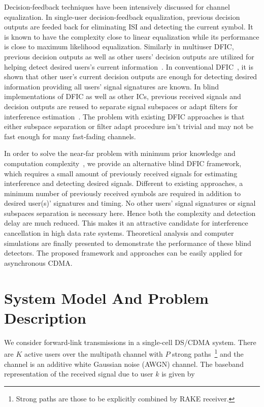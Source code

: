 \documentclass[a4paper,10pt,fleqn, twocolumn]{IEEETran}
\begin{document}
Decision-feedback techniques have been intensively discussed for
channel equalization. In single-user decision-feedback
equalization, previous decision outputs are feeded back for
eliminating ISI and detecting the current symbol. It is known to
have the complexity close to linear equalization while its
performance is close to maximum likelihood equalization. Similarly
in multiuser DFIC, previous decision outputs as well as other
users' decision outputs are utilized for helping detect desired
users's current information~\cite{Madh94,Madh98,Wang98,Verd98}. In
conventional DFIC~\cite{Verd98}, it is shown that other user's
current decision outputs are enough for detecting desired
information providing all users' signal signatures are known. In
blind implementations of DFIC as well as other ICs, previous
received signals and decision outputs are reused to separate
signal subspaces or adapt filters for interference
estimation~\cite{Madh98,Wang98}. The problem with existing DFIC
approaches is that either subspace separation or filter adapt
procedure isn't trivial and may not be fast enough for many
fast-fading channels.

In order to solve the near-far problem with minimum prior
knowledge and computation complexity~\cite{Wang03d,Wang05A}, we
provide an alternative blind DFIC framework, which requires a
small amount of previously received signals for estimating
interference and detecting desired signals. Different to existing
approaches, a minimum number of previously received symbols are
required in addition to desired user(s)' signatures and timing. No
other users' signal signatures or signal subspaces separation is
necessary here. Hence both the complexity and detection delay are
much reduced. This makes it an attractive candidate for
interference cancellation in high data rate systems. Theoretical
analysis and computer simulations are finally presented to
demonstrate the performance of these blind detectors. The proposed
framework and approaches can be easily applied for asynchronous
CDMA.
\section{System Model And Problem Description}
We consider forward-link transmissions in a single-cell DS/CDMA
system. There are $K$ active users over the multipath channel with
$P$ strong paths~\footnote{Strong paths are those to be explicitly
combined by RAKE receiver.} and the channel is an additive white
Gaussian noise (AWGN) channel. The baseband representation of the
received signal due to user $k$ is given by
\end{document}
